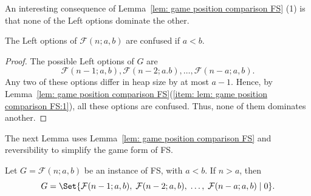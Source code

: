 \documentclass[oneside,reqno]{amsart}
\newcommand{\fs}{\mathcal{F}}
\begin{document}
    






An interesting consequence of Lemma~\ref{lem: game position comparison FS} (1) is that none of the Left options dominate the other.


\begin{lemma}\label{cor: no domination}
    The Left options of $\fs(n;a,b)$ are confused if $a<b$.
\end{lemma}
\begin{proof}
    The possible Left options of $G$ are 
    $$\fs(n-1;a,b),\fs(n-2;a.b),\dots,\fs(n-a;a,b).$$
    Any two of these options differ in heap size by at most $a-1$. Hence, by Lemma~\ref{lem: game position comparison FS}(\ref{item: lem: game position comparison FS:1}), all these options are confused. Thus, none of them dominates another.
\end{proof}



The next Lemma uses Lemma~\ref{lem: game position comparison FS} and reversibility to simplify the game form of {\sc FS}. 




\begin{lemma}\label{lem: game equivalence}
Let $G=\fs(n;a,b)$ be an instance of {\sc FS}, with $a<b$. If $n>a$, then
\begin{equation*}
    G=\Set{\fs(n-1;a,b),\; \fs(n-2;a,b),\; \dots,\; \fs(n-a;a,b)\mid 0}.
\end{equation*}
\end{lemma}

\end{document}
